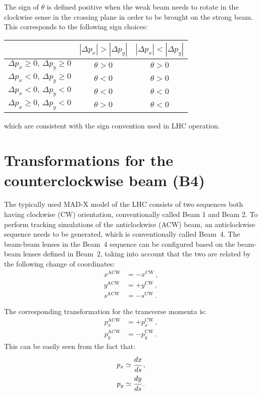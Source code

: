 The sign of $\theta$ is defined positive when the weak beam needs to rotate in the clockwise sense in the crossing plane in order to be brought on the strong beam. This corresponds to the following sign choices:
\begin{center}
  \begin{tabular}{c|cc}
     &  $\left|\Delta p_x\right| > \left|\Delta p_y\right|$ & $\left|\Delta p_x\right| < \left|\Delta p_y\right|$\\
     \hline
 $\Delta p_x\geq0,\,   \Delta p_y \geq 0$  &$\theta>0$ &$\theta>0$\\
 $\Delta p_x < 0,\,   \Delta p_y \geq 0$  &$\theta<0$ &$\theta>0$\\
 $\Delta p_x < 0,\,   \Delta p_y < 0$  &$\theta<0$ &$\theta<0$\\
 $\Delta p_x\geq0,\,   \Delta p_y < 0$  &$\theta>0$ &$\theta<0$\\
\end{tabular}  
\end{center}
which are consistent with the sign convention used in LHC operation.


\section{Transformations for the counterclockwise beam (B4)}
\label{sec:b4}

The typically used MAD-X model of the LHC consists of two sequences both having clockwise (CW) orientation, conventionally called Beam 1 and Beam 2. To perform tracking simulations of the anticlockwise (ACW) beam, an anticlockwise sequence needs to be generated, which is conventionally called Beam~4. The beam-beam lenses in the Beam~4 sequence can be configured based on the beam-beam lenses defined in Beam~2, taking into account that the two are related by the following change of coordinates:
\begin{align}
    x^\text{ACW} &= -x^\text{CW} \, , \label{eq:b4x}\\
    y^\text{ACW} &= +y^\text{CW} \, , \\
    s^\text{ACW} &= -s^\text{CW} \, .
\end{align}

The corresponding transformation for the transverse momenta is:
\begin{align}
    p_x^\text{ACW} &= +p_x^\text{CW} \, ,\\
    p_y^\text{ACW} &= -p_y^\text{CW} \, .\label{eq:b4py}
\end{align}
This can be easily seen from the fact that:
\begin{align}
    p_x &\simeq \cfrac{dx}{ds} \, ,\\
    p_y &\simeq \cfrac{dy}{ds} \, .
\end{align}

